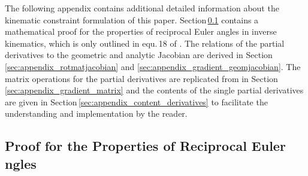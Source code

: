 \documentclass[robotics,article,accept,moreauthors,pdftex]{Definitions/mdpi}
\begin{document}
The following appendix contains additional detailed information about the kinematic constraint formulation of this paper.
Section\,\ref{sec:appendix_eulerreciproc} contains a mathematical proof for the properties of reciprocal Euler angles in inverse kinematics, which is only outlined in equ.\,18 of \cite{1_SchapplerTapOrt2019}.
The relations of the partial derivatives to the geometric and analytic Jacobian are derived in Section\,\ref{sec:appendix_rotmatjacobian} and \ref{sec:appendix_gradient_geomjacobian}.
The matrix operations for the partial derivatives are replicated from \cite{1_SchapplerTapOrt2019} in Section\,\ref{sec:appendix_gradient_matrix} and the contents of the single partial derivatives are given in Section\,\ref{sec:appendix_content_derivatives} to facilitate the understanding and implementation by the reader.

\subsection{Proof for the Properties of Reciprocal Euler ngles}
\label{sec:appendix_eulerreciproc}
\end{document}

